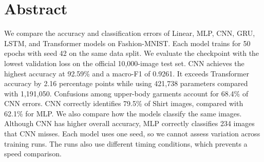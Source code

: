\section*{Abstract}
We compare the accuracy and classification errors of Linear, MLP, CNN, GRU,
LSTM, and Transformer models on Fashion-MNIST. Each model trains for 50 epochs
with seed 42 on the same data split. We evaluate the checkpoint with the lowest
validation loss on the official 10,000-image test set. CNN achieves the highest
accuracy at 92.59\% and a macro-F1 of 0.9261. It exceeds Transformer accuracy
by 2.16 percentage points while using 421,738 parameters compared with
1,191,050. Confusions among upper-body garments account for 68.4\% of CNN
errors. CNN correctly identifies 79.5\% of Shirt images, compared with 62.1\%
for MLP. We also compare how the models classify the same images. Although
CNN has higher overall accuracy, MLP correctly classifies 234 images that CNN
misses. Each model uses one seed, so we cannot assess variation across training
runs. The runs also use different timing conditions, which prevents a speed
comparison.
